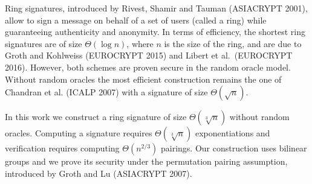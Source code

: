 Ring signatures, introduced by Rivest, Shamir and Tauman (ASIACRYPT 2001), allow to sign a message on behalf of a set of users (called a ring) while guaranteeing authenticity and anonymity. In terms of efficiency, the shortest ring signatures are of size $\Theta(\log n)$, where $n$ is the size of the ring, and are due to Groth and Kohlweiss (EUROCRYPT 2015) and Libert et al.~(EUROCRYPT 2016). However, both schemes are proven secure in the random oracle model. Without random oracles the most efficient construction remains the one of Chandran et al. (ICALP 2007) with a signature of size $\Theta(\sqrt{n})$.

In this work we construct a ring signature of size $\Theta(\sqrt[3]{n})$ without random oracles. Computing a signature requires $\Theta(\sqrt[3]{n})$ exponentiations and verification requires computing $\Theta(n^{2/3})$ pairings. Our construction uses bilinear groups and we prove its security under the permutation pairing assumption, introduced by Groth and Lu (ASIACRYPT 2007).
